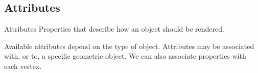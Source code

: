 \documentclass[../notes.tex]{subfiles}
\begin{document}
      \subsection{Attributes}
        \begin{definition}{Attributes}
          Properties that describe how an object should be rendered.
        \end{definition}

        Available attributes depend on the type of object.
        Attributes may be associated with, or  to, a specific geometric object.
        We can also associate properties with each vertex.
\end{document}
